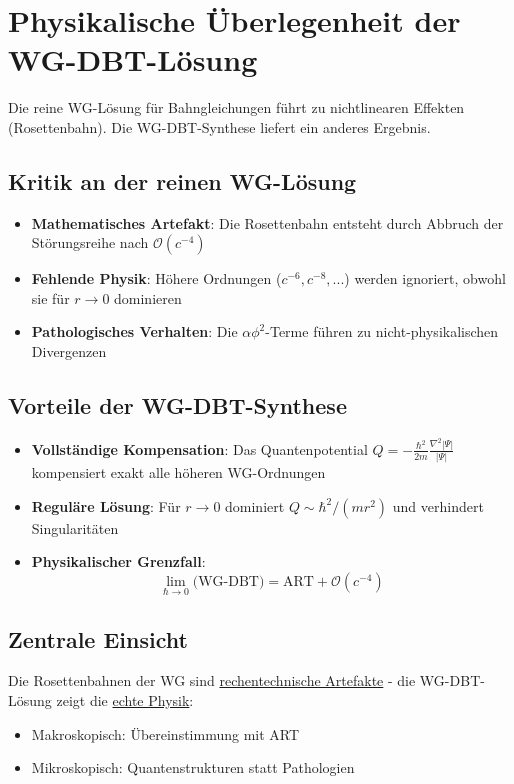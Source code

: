 \section{Physikalische Überlegenheit der WG-DBT-Lösung}
Die reine WG-Lösung für Bahngleichungen führt zu nichtlinearen Effekten (Rosettenbahn). Die WG-DBT-Synthese liefert ein anderes Ergebnis.

\subsection{Kritik an der reinen WG-Lösung}
\begin{itemize}
\item \textbf{Mathematisches Artefakt}: Die Rosettenbahn entsteht durch Abbruch der Störungsreihe nach $\mathcal{O}(c^{-4})$
\item \textbf{Fehlende Physik}: Höhere Ordnungen ($c^{-6}, c^{-8},...$) werden ignoriert, obwohl sie für $r \to 0$ dominieren
\item \textbf{Pathologisches Verhalten}: Die $\alpha\phi^2$-Terme führen zu nicht-physikalischen Divergenzen
\end{itemize}

\subsection{Vorteile der WG-DBT-Synthese}
\begin{itemize}
\item \textbf{Vollständige Kompensation}: Das Quantenpotential 
$Q = -\frac{\hbar^2}{2m}\frac{\nabla^2|\Psi|}{|\Psi|}$ 
kompensiert exakt alle höheren WG-Ordnungen

\item \textbf{Reguläre Lösung}: Für $r \to 0$ dominiert $Q \sim \hbar^2/(mr^2)$ und verhindert Singularitäten

\item \textbf{Physikalischer Grenzfall}:
\begin{equation}
\lim_{\hbar \to 0} \text{(WG-DBT)} = \text{ART} + \mathcal{O}(c^{-4})
\end{equation}
\end{itemize}

\subsection{Zentrale Einsicht}
Die Rosettenbahnen der WG sind \underline{rechentechnische Artefakte} - die WG-DBT-Lösung zeigt die \underline{echte Physik}:
\begin{itemize}
\item Makroskopisch: Übereinstimmung mit ART
\item Mikroskopisch: Quantenstrukturen statt Pathologien
\end{itemize}
